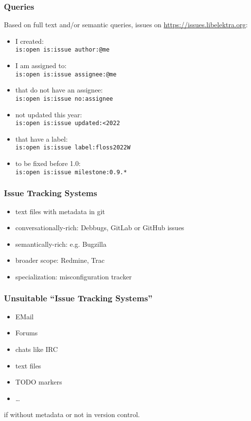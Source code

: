 \begin{frame}[fragile]
	\frametitle{Queries}
	Based on full text and/or semantic queries, issues on \url{https://issues.libelektra.org}:

	\begin{itemize}
		\item I created: \\
			\verb+is:open is:issue author:@me+
		\item I am assigned to: \\
			\verb+is:open is:issue assignee:@me+
		\item that do not have an assignee: \\
			\verb+is:open is:issue no:assignee+
		\item not updated this year: \\
			\verb+is:open is:issue updated:<2022+
		\item that have a label: \\
			\verb+is:open is:issue label:floss2022W+
		\item to be fixed before 1.0: \\
			\verb+is:open is:issue milestone:0.9.*+
	\end{itemize}
\end{frame}

\begin{frame}
	\frametitle{Issue Tracking Systems}

	\begin{itemize}
		\item text files with metadata in git
		\item conversationally-rich: Debbugs, GitLab or GitHub issues
		\item semantically-rich: e.g. Bugzilla
		\item broader scope: Redmine, Trac
		\item specialization: misconfiguration tracker
	\end{itemize}
\end{frame}

\begin{frame}
	\frametitle{Unsuitable ``Issue Tracking Systems''}

	\begin{itemize}
		\item EMail
		\item Forums
		\item chats like IRC
		\item text files
		\item TODO markers
		\item \dots
	\end{itemize}

	if without metadata or not in version control.
\end{frame}

